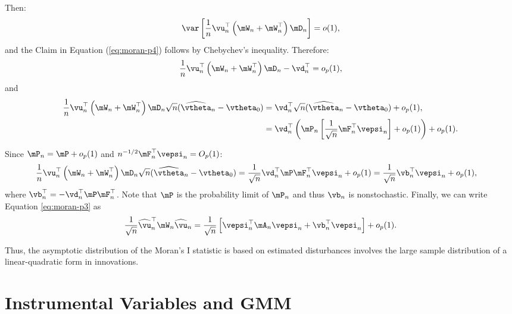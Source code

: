 \documentclass[english,12pt]{book}\usepackage[]{graphicx}\usepackage[]{xcolor}
\begin{document}
\begin{subappendices}
Then:
\begin{equation*}
  \var\left[\frac{1}{n}\vu_n^\top\left(\mW_n + \mW_n^\top\right)\mD_n\right] = o(1),
\end{equation*}
%
and the Claim in Equation (\ref{eq:moran-p4}) follows by Chebychev's inequality. Therefore:
\begin{equation*}
\frac{1}{n}\vu_n^\top\left(\mW_n + \mW_n^\top\right)\mD_n - \vd_n^\top = o_p(1),
\end{equation*}
%
and
\begin{equation*}
\begin{aligned}
\frac{1}{n}\vu_n^\top\left(\mW_n + \mW_n^\top\right)\mD_n\sqrt{n}(\widehat{\vtheta}_n - \vtheta_0) & =  \vd_n^\top\sqrt{n}(\widehat{\vtheta}_n - \vtheta_0) + o_p(1), \\
& = \vd_n^\top\left(\mP_n\left[\frac{1}{\sqrt{n}}\mF_n^\top\vepsi_n\right] + o_p(1)\right) + o_p(1).
\end{aligned}
\end{equation*}

Since $\mP_n = \mP + o_p(1)$ and $n^{-1/2}\mF_n^\top\vepsi_n = O_p(1)$:
\begin{equation*}
\begin{aligned}
\frac{1}{n}\vu_n^\top\left(\mW_n + \mW_n^\top\right)\mD_n\sqrt{n}(\widehat{\vtheta}_n - \vtheta_0) &= \frac{1}{\sqrt{n}}\vd_n^\top\mP\mF_n^\top\vepsi_n + o_p(1) = \frac{1}{\sqrt{n}}\vb_n^\top\vepsi_n + o_p(1), 
\end{aligned}
\end{equation*}
%
where $\vb_n^\top = -\vd_n^\top\mP\mF_n^\top$. Note that $\mP$ is the probability limit of $\mP_n$ and thus $\vb_n$ is nonstochastic. Finally, we can write Equation \eqref{eq:moran-p3} as
\begin{equation*}
\frac{1}{\sqrt{n}}\widehat{\vu}_n^\top\mW_n\widehat{\vu}_n =\frac{1}{\sqrt{n}}\left[\vepsi_n^\top\mA_n\vepsi_n + \vb_n^\top\vepsi_n\right] + o_p(1).
\end{equation*}

Thus, the asymptotic distribution of the Moran's I statistic is based on estimated disturbances involves the large sample distribution of a linear-quadratic form in innovations. 


\end{subappendices}





\chapter{Instrumental Variables and GMM}\label{chapter:gmm}
\end{document}
